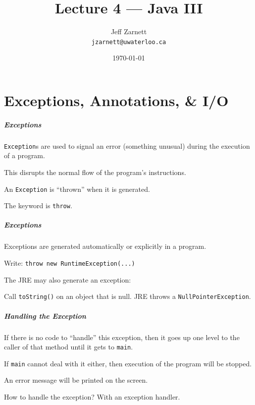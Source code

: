 


\title{Lecture 4 --- Java III}

\author{Jeff Zarnett \\ \small \texttt{jzarnett@uwaterloo.ca}}
\date{\today}





\begin{frame}
  \titlepage
\end{frame}

\part{Exceptions, Annotations, \& I/O}
\frame{\partpage}

\begin{frame}
\frametitle{Exceptions}
\begin{changemargin}{1cm}

\texttt{Exception}s are used to signal an error (something unusual) during the execution of a program.

This disrupts the normal flow of the program's instructions.

An \texttt{Exception} is ``thrown'' when it is generated.

The keyword is \texttt{throw}.

\end{changemargin}
\end{frame}

\begin{frame}
\frametitle{Exceptions}
\begin{changemargin}{1cm}

Exceptions are generated automatically or explicitly in a program.

Write: \texttt{throw new RuntimeException(...)}

The JRE may also generate an exception:

Call \texttt{toString()} on an object that is null. JRE throws a \texttt{NullPointerException}.


\end{changemargin}
\end{frame}

\begin{frame}
\frametitle{Handling the Exception}
\begin{changemargin}{1cm}

If there is no code to ``handle'' this exception, then it goes up one level to the caller of that method until it gets to \texttt{main}. 

If \texttt{main} cannot deal with it either, then execution of the program will be stopped.

An error message will be printed on the screen. 

How to handle the exception? With an exception handler. 

\end{changemargin}
\end{frame}

